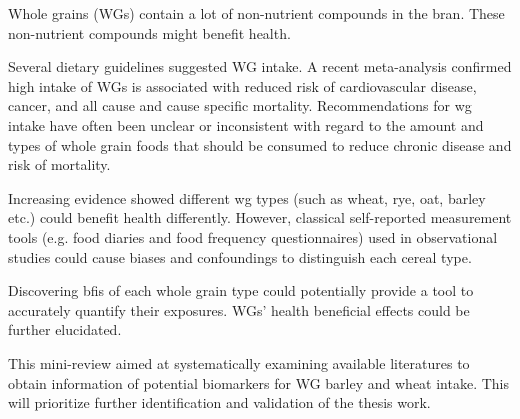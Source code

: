 Whole grains (WGs) contain a lot of non-nutrient compounds in the bran. 
These non-nutrient compounds might benefit health.

Several dietary guidelines suggested WG intake\cite{Piepoli2016}. 
A recent meta-analysis confirmed high intake of WGs is associated with reduced risk of cardiovascular disease, cancer, and all cause and cause specific mortality\cite{Aune2016}. 
Recommendations for \acrshort{wg} intake have often been unclear or inconsistent with regard to the amount and types of whole grain foods that should be consumed to reduce chronic disease and risk of mortality.

Increasing evidence showed different \acrshort{wg} types (such as wheat, rye, oat, barley etc.) could benefit health differently. 
However, classical self-reported measurement tools (e.g. food diaries and food frequency questionnaires) used in observational studies could cause biases and confoundings to distinguish each cereal type.
 


Discovering \acrshort{bfis} of each whole grain type could potentially provide a tool to accurately quantify their exposures. WGs' health beneficial effects could be further elucidated. 

This mini-review aimed at systematically examining available literatures to obtain information of potential biomarkers for WG barley and wheat intake. This will prioritize further identification and validation of the thesis work.